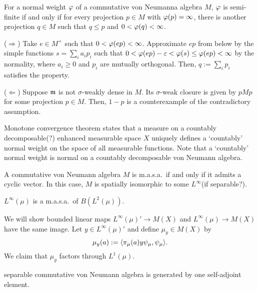 \documentclass{../../large}
\begin{document}
\begin{prb}
For a normal weight $\varphi$ of a commutative von Neumanna algebra $M$, $\varphi$ is semi-finite if and only if for every projection $p\in M$ with $\varphi(p)=\infty$, there is another projection $q\in M$ such that $q\le p$ and $0<\varphi(q)<\infty$.
\end{prb}
\begin{pf}
($\Rightarrow$)
Take $e\in M^+$ such that $0<\varphi(ep)<\infty$.
Approximate $ep$ from below by the simple functions $s=\sum_ia_ip_i$ such that $0<\varphi(ep)-\varepsilon<\varphi(s)\le\varphi(ep)<\infty$ by the normality, where $a_i\ge0$ and $p_i$ are mutually orthogonal.
Then, $q:=\sum_ip_i$ satisfies the property.

($\Leftarrow$)
Suppose $\mathfrak{m}$ is not $\sigma$-weakly dense in $M$.
Its $\sigma$-weak closure is given by $pMp$ for some projection $p\in M$.
Then, $1-p$ is a counterexample of the contradictory assumption.
\end{pf}



Monotone convergence theorem states that a measure on a countably decomposable(?) enhanced measurable space $X$ uniquely defines a `countably' normal weight on the space of all measurable functions.
Note that a `countably' normal weight is normal on a countably decomposable von Neumann algebra.



\begin{prb}
A commutative von Neumann algebra $M$ is m.a.s.a.~if and only if it admits a cyclic vector.
In this case, $M$ is spatially isomorphic to some $L^\infty$(if separable?).

$L^\infty(\mu)$ is a m.a.s.a.~of $B(L^2(\mu))$.
\end{prb}
\begin{pf}
We will show bounded linear maps $L^\infty(\mu)'\to M(X)$ and $L^\infty(\mu)\to M(X)$ have the same image.
Let $y\in L^\infty(\mu)'$ and define $\mu_y\in M(X)$ by
\[\mu_y(a):=\langle\pi_\mu(a)y\psi_\mu,\psi_\mu\rangle.\]
We claim that $\mu_y$ factors through $L^1(\mu)$.
\end{pf}

separable commutative von Neumann algebra is generated by one self-adjoint element.
\end{document}
